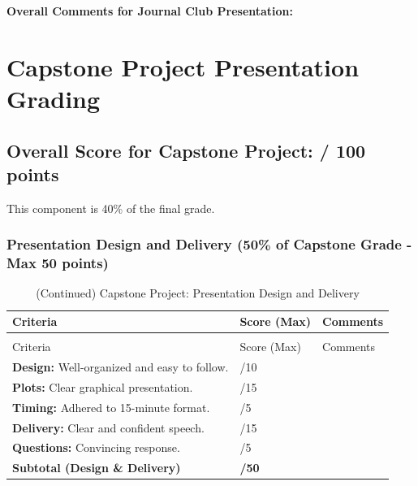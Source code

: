 \documentclass{article}
\begin{document}
\textbf{Overall Comments for Journal Club Presentation:}

\newpage
\section{Capstone Project Presentation Grading}
\subsection*{Overall Score for Capstone Project: \underline{\hspace{1.5cm}} / 100 points}
This component is 40\% of the final grade.

\subsubsection*{Presentation Design and Delivery (50\% of Capstone Grade - Max 50 points)}
\begin{longtable}{@{}>{\RaggedRight\arraybackslash}p{} >{\centering\arraybackslash}p{} >{\RaggedRight\arraybackslash}p{}@{}}
\toprule
Criteria & Score (Max) & Comments \\
\midrule
\endfirsthead
\caption[]{(Continued) Capstone Project: Presentation Design and Delivery} \\
\toprule
Criteria & Score (Max) & Comments \\
\midrule
\endhead
\bottomrule
\endfoot
\textbf{Design:} Well-organized and easy to follow. & /10 & \\
\addlinespace
\textbf{Plots:} Clear graphical presentation. & /15 & \\
\addlinespace
\textbf{Timing:} Adhered to 15-minute format. & /5 & \\
\addlinespace
\textbf{Delivery:} Clear and confident speech. & /15 & \\
\addlinespace
\textbf{Questions:} Convincing response. & /5 & \\
\midrule
\textbf{Subtotal (Design \& Delivery)} & \textbf{/50} & \\
\end{longtable}
\end{document}
